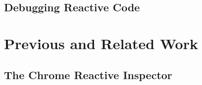 	\subsection{Debugging Reactive Code}

\section{Previous and Related Work}
	\subsection{The Chrome Reactive Inspector}
